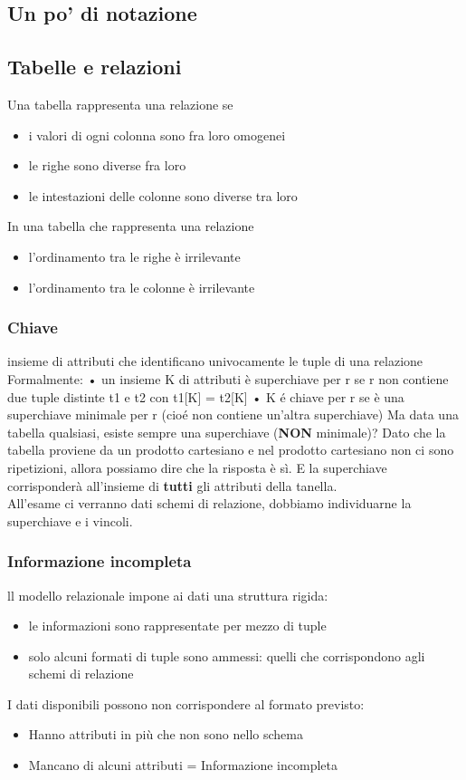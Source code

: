 \subsection{Un po' di notazione}


\subsection{Tabelle e relazioni}
Una tabella rappresenta una relazione se
\begin{itemize}
    \item i valori di ogni colonna sono fra loro omogenei
    \item le righe sono diverse fra loro
    \item le intestazioni delle colonne sono diverse tra loro
\end{itemize}
In una tabella che rappresenta una relazione
\begin{itemize}
    \item l'ordinamento tra le righe è irrilevante
    \item l'ordinamento tra le colonne è irrilevante
\end{itemize}

\subsubsection{Chiave}
insieme di attributi che identificano univocamente le tuple di
una relazione
Formalmente:
• un insieme K di attributi è superchiave per r se r non
contiene due tuple distinte t1 e t2 con t1[K] = t2[K]
• K é chiave per r se è una superchiave minimale per r (cioé non contiene un'altra superchiave)
Ma data una tabella qualsiasi, esiste sempre una superchiave (\textbf{NON} minimale)? Dato che la tabella proviene da un prodotto cartesiano e nel prodotto cartesiano non ci sono ripetizioni, allora possiamo dire che la risposta è sì. E la superchiave corrisponderà all'insieme di \textbf{tutti} gli attributi della tanella.
\\All'esame ci verranno dati schemi di relazione, dobbiamo individuarne la superchiave e i vincoli.

\subsubsection{Informazione incompleta}
ll modello relazionale impone ai dati una struttura rigida:
\begin{itemize}
    \item le informazioni sono rappresentate per mezzo di tuple
    \item solo alcuni formati di tuple sono ammessi: quelli che corrispondono agli schemi di relazione
\end{itemize}
I dati disponibili possono non corrispondere al formato previsto:
\begin{itemize}
    \item Hanno attributi in più che non sono nello schema
    \item Mancano di alcuni attributi = Informazione incompleta
\end{itemize}

